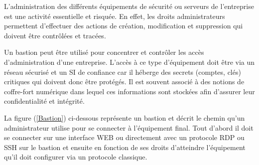 
L'administration des différents équipements de sécurité ou serveurs de l'entreprise est une activité essentielle et risquée. En effet, les droits administrateurs permettent d'effectuer des actions de création, modification et suppression qui doivent être contrôlées et tracées.

Un bastion peut être utilisé pour concentrer et contrôler les accès d'administration d'une entreprise. L'accès à ce type d'équipement doit être via un réseau sécurisé et un SI de confiance car il héberge des secrets (comptes, clés) critiques qui doivent donc être protégés. Il est souvent associé à des notions de coffre-fort numérique dans lequel ces informations sont stockées afin d'assurer leur confidentialité et intégrité.

La figure (\ref{Bastion}) ci-dessous représente un bastion et décrit le chemin qu'un administrateur utilise pour se connecter à l'équipement final. Tout d'abord il doit se connecter sur une interface WEB ou directement avec un protocole RDP ou SSH sur le bastion et ensuite en fonction de ses droits d'atteindre l'équipement qu'il doit configurer via un protocole classique.



